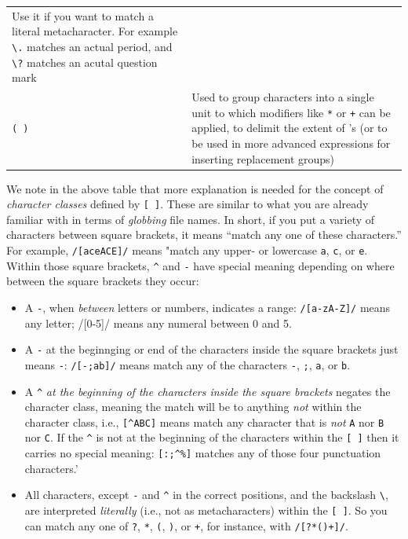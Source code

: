 \documentclass[]{krantz}
\providecommand{\tightlist}{%
  \setlength{\itemsep}{0pt}\setlength{\parskip}{0pt}}
\begin{document}
\begin{longtable}[]{@{}ll@{}}
\begin{minipage}[t]{0.43\columnwidth}
Use it if you want to match a
literal metacharacter. For
example \texttt{\textbackslash{}.} matches an actual
period, and \texttt{\textbackslash{}?} matches an
acutal question mark\strut
\end{minipage}\tabularnewline
\begin{minipage}[t]{0.25\columnwidth}\raggedright
\texttt{(\ )}\strut
\end{minipage} & \begin{minipage}[t]{0.43\columnwidth}\raggedright
Used to group characters into
a single unit to which
modifiers like \texttt{*} or \texttt{+} can
be applied, to delimit the
extent of \texttt{\textbar{}}'s (or to be used
in more advanced expressions
for inserting replacement
groups)\strut
\end{minipage}\tabularnewline
\bottomrule
\end{longtable}

We note in the above table that more explanation is needed for the concept of \emph{character classes} defined by \texttt{{[}\ {]}}.
These are similar to what you are already
familiar with in terms of \emph{globbing} file names. In short, if you
put a variety of characters between square brackets, it means ``match any one of these characters.''
For example, \texttt{/{[}aceACE{]}/} means "match any upper- or lowercase \texttt{a}, \texttt{c}, or \texttt{e}. Within
those square brackets, \texttt{\^{}} and \texttt{-} have special meaning depending on where between
the square brackets they occur:

\begin{itemize}
\tightlist
\item
  A \texttt{-}, when \emph{between} letters or numbers, indicates a range: \texttt{/{[}a-zA-Z{]}/} means any letter;
  /{[}0-5{]}/ means any numeral between 0 and 5.
\item
  A \texttt{-} at the beginnging or end of the characters inside the square brackets just means \texttt{-}: \texttt{/{[}-;ab{]}/} means
  match any of the characters \texttt{-}, \texttt{;}, \texttt{a}, or \texttt{b}.
\item
  A \texttt{\^{}} \emph{at the beginning of the characters inside the square brackets} negates the character class, meaning
  the match will be to anything \emph{not} within the character class, i.e., \texttt{{[}\^{}ABC{]}} means match any character
  that is \emph{not} \texttt{A} nor \texttt{B} nor \texttt{C}. If the \texttt{\^{}} is not at the beginning of the characters within the \texttt{{[}\ {]}}
  then it carries no special meaning: \texttt{{[}:;\^{}\%{]}} matches any of those four punctuation characters.'
\item
  All characters, except \texttt{-} and \texttt{\^{}} in the correct positions, and the backslash \texttt{\textbackslash{}}, are interpreted \emph{literally}
  (i.e., not as metacharacters) within the \texttt{{[}\ {]}}. So you can match any one of \texttt{?}, \texttt{*}, \texttt{(}, \texttt{)}, or \texttt{+}, for instance, with \texttt{/{[}?*()+{]}/}.
\end{itemize}
\end{document}
